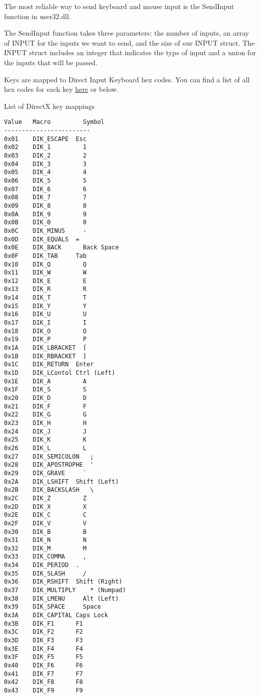 \documentclass[
  openany]{book}
\begin{document}
The most reliable way to send keyboard and mouse input is the SendInput function in user32.dll.

The SendInput function takes three parameters: the number of inputs, an array of INPUT for the inputs we want to send, and the size of our INPUT struct. The INPUT struct includes an integer that indicates the type of input and a union for the inputs that will be passed.

Keys are mapped to Direct Input Keyboard hex codes. You can find a list of all hex codes for each key \href{http://www.flint.jp/misc/?q=dik\&lang=en}{here} or below.

List of DirectX key mappings

\begin{verbatim}
Value   Macro         Symbol
------------------------
0x01    DIK_ESCAPE  Esc 
0x02    DIK_1         1 
0x03    DIK_2         2 
0x04    DIK_3         3 
0x05    DIK_4         4 
0x06    DIK_5         5 
0x07    DIK_6         6 
0x08    DIK_7         7 
0x09    DIK_8         8 
0x0A    DIK_9         9 
0x0B    DIK_0         0 
0x0C    DIK_MINUS     - 
0x0D    DIK_EQUALS  =   
0x0E    DIK_BACK      Back Space    
0x0F    DIK_TAB     Tab 
0x10    DIK_Q         Q 
0x11    DIK_W         W 
0x12    DIK_E         E 
0x13    DIK_R         R 
0x14    DIK_T         T 
0x15    DIK_Y         Y 
0x16    DIK_U         U 
0x17    DIK_I         I 
0x18    DIK_O         O 
0x19    DIK_P         P 
0x1A    DIK_LBRACKET  [ 
0x1B    DIK_RBRACKET  ] 
0x1C    DIK_RETURN  Enter   
0x1D    DIK_LContol Ctrl (Left) 
0x1E    DIK_A         A 
0x1F    DIK_S         S 
0x20    DIK_D         D 
0x21    DIK_F         F 
0x22    DIK_G         G 
0x23    DIK_H         H 
0x24    DIK_J         J 
0x25    DIK_K         K 
0x26    DIK_L         L 
0x27    DIK_SEMICOLON   ;   
0x28    DIK_APOSTROPHE  '   
0x29    DIK_GRAVE     ` 
0x2A    DIK_LSHIFT  Shift (Left)    
0x2B    DIK_BACKSLASH   \   
0x2C    DIK_Z         Z 
0x2D    DIK_X         X 
0x2E    DIK_C         C 
0x2F    DIK_V         V 
0x30    DIK_B         B 
0x31    DIK_N         N 
0x32    DIK_M         M 
0x33    DIK_COMMA     , 
0x34    DIK_PERIOD  .   
0x35    DIK_SLASH     / 
0x36    DIK_RSHIFT  Shift (Right)   
0x37    DIK_MULTIPLY    * (Numpad)  
0x38    DIK_LMENU     Alt (Left)    
0x39    DIK_SPACE     Space 
0x3A    DIK_CAPITAL Caps Lock
0x3B    DIK_F1      F1  
0x3C    DIK_F2      F2  
0x3D    DIK_F3      F3  
0x3E    DIK_F4      F4  
0x3F    DIK_F5      F5  
0x40    DIK_F6      F6  
0x41    DIK_F7      F7  
0x42    DIK_F8      F8  
0x43    DIK_F9      F9  

\end{verbatim}
\end{document}
